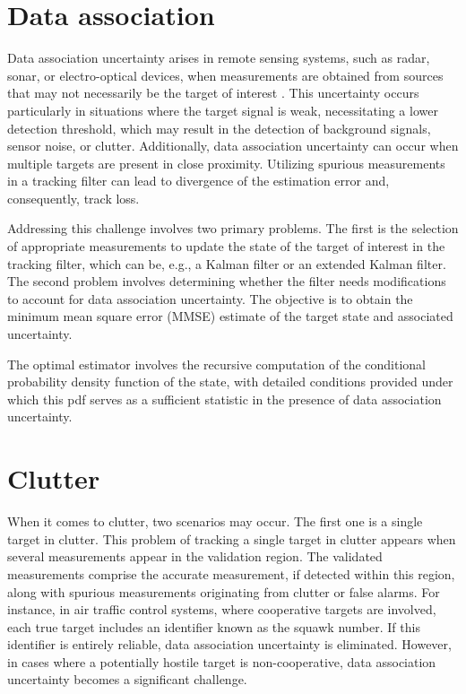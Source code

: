 \section{Data association}
\label{sec:data_association}
Data association uncertainty arises in remote sensing systems, such as radar, sonar, or electro-optical devices, when
measurements are obtained from sources that may not necessarily be the target of interest \cite{BarShalomPDA}. This uncertainty
occurs particularly in situations where the target signal is weak, necessitating a lower detection threshold, which
may result in the detection of background signals, sensor noise, or clutter. Additionally, data association uncertainty can occur when multiple targets are present in close proximity. Utilizing spurious measurements in a tracking filter can lead to divergence of the estimation error and, consequently, track loss.

Addressing this challenge involves two primary problems. The first is the selection of appropriate measurements to
update the state of the target of interest in the tracking filter, which can be, e.g., a Kalman filter or an extended
Kalman
filter. The second problem involves determining whether the filter needs modifications to account for data
association uncertainty. The objective is to obtain the minimum mean square error (MMSE) estimate of the target state
and associated uncertainty.

The optimal estimator involves the recursive computation of the conditional probability density function of the
state, with detailed conditions provided under which this pdf serves as a sufficient statistic in the presence of
data association uncertainty.

\section{Clutter}
When it comes to clutter, two scenarios may occur. The first one is a single target in clutter. This problem of
tracking a single target in clutter appears when several measurements appear in the validation region. The
validated measurements comprise the accurate measurement, if detected within this region, along with spurious
measurements originating from clutter or false alarms. For instance, in air traffic control systems, where cooperative
targets
are
involved, each true target includes an identifier known as the squawk number. If this identifier is entirely
reliable, data association uncertainty is eliminated. However, in cases where a potentially hostile target is non-cooperative, data association uncertainty becomes a significant challenge.

